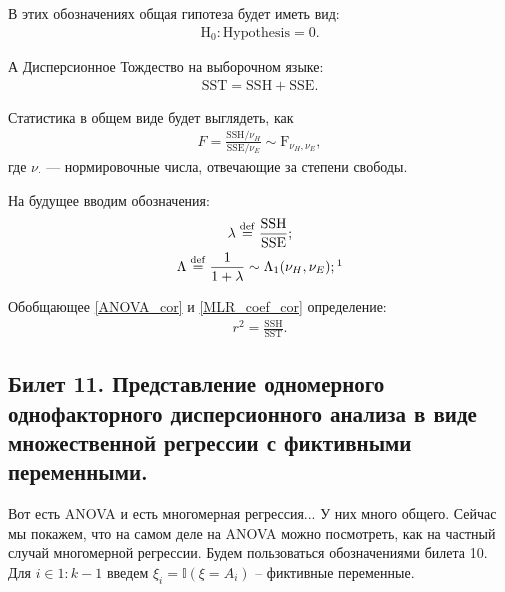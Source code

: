 В этих обозначениях общая гипотеза будет иметь вид:
\begin{gather*}
    \mathrm H_0: \mathrm{Hypothesis} = 0.
\end{gather*}

А Дисперсионное Тождество на выборочном языке:
\begin{gather*}
    \mathrm{SST = SSH + SSE}.
\end{gather*}

Статистика в общем виде будет выглядеть, как
\begin{gather*}
    F = \frac{\mathrm{SSH} / \nu_H}{\mathrm{SSE} / \nu_E} \sim \mathrm F_{\nu_H, \nu_E},
\end{gather*}
где $\nu_\cdot$ --- нормировочные числа, отвечающие за степени свободы.

На будущее вводим обозначения:
\begin{gather*}
    \lambda \overset{\mathrm{def}}{=} \mathrm{\frac{SSH}{SSE}};\\
    \Lambda \overset{\mathrm{def}}{=} \frac{1}{1 + \lambda} \sim \Lambda_1 (\nu_H, \nu_E);\footnotemark
\end{gather*}

Обобщающее \eqref{ANOVA_cor} и \eqref{MLR_coef_cor} определение:
\begin{gather*}
    r^2 = \mathrm{\frac{SSH}{SST}}. 
\end{gather*}


\subsection{Билет 11. Представление одномерного однофакторного дисперсионного анализа в виде множественной регрессии с фиктивными переменными.}

Вот есть ANOVA и есть многомерная регрессия... У них много общего. Сейчас мы покажем, что на самом деле на ANOVA можно посмотреть, как на частный случай многомерной регрессии.
Будем пользоваться обозначениями билета 10.
Для $i \in 1:{k-1}$ введем $\xi_i = \mathbb I (\xi = A_i)$ -- фиктивные переменные.

